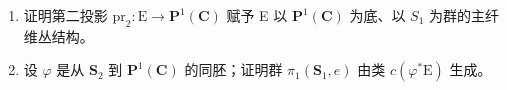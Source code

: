 \begin{enumerate}
\def\labelenumi{\alph{enumi})}
\item
  证明第二投影 \(\mathrm{pr}_{2}\colon\mathrm{E}\to\mathbf{P}^{1}(\mathbf{C})\) 赋予 E 以 \(\mathbf{P}^{1}(\mathbf{C})\) 为底、以 \(S_{1}\) 为群的主纤维丛结构。
\item
  设 \(\varphi\) 是从 \(\mathbf{S}_2\) 到 \(\mathbf{P}^1 (\mathbf{C})\) 的同胚；证明群 \(\pi_1(\mathbf{S}_1,e)\) 由类 \(c(\varphi^{*}\mathrm{E})\) 生成。
\end{enumerate}

\backmatter

